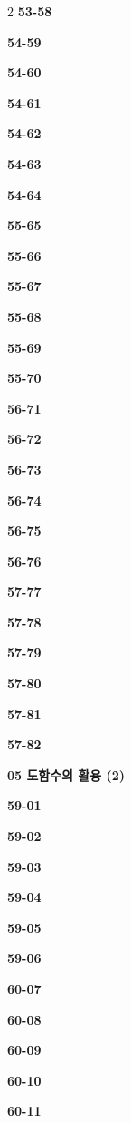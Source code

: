 \documentclass[10pt,a4paper]{article}
\begin{document}
\begin{multicols}{2}
\noindent\textbf{53-58}\ \par
\noindent\textbf{54-59}\ \par
\noindent\textbf{54-60}\ \par
\noindent\textbf{54-61}\ \par
\noindent\textbf{54-62}\ \par
\noindent\textbf{54-63}\ \par
\noindent\textbf{54-64}\ \par
\noindent\textbf{55-65}\ \par
\noindent\textbf{55-66}\ \par
\noindent\textbf{55-67}\ \par
\noindent\textbf{55-68}\ \par
\noindent\textbf{55-69}\ \par
\noindent\textbf{55-70}\ \par
\noindent\textbf{56-71}\ \par
\noindent\textbf{56-72}\ \par
\noindent\textbf{56-73}\ \par
\noindent\textbf{56-74}\ \par
\noindent\textbf{56-75}\ \par
\noindent\textbf{56-76}\ \par
\noindent\textbf{57-77}\ \par
\noindent\textbf{57-78}\ \par
\noindent\textbf{57-79}\ \par
\noindent\textbf{57-80}\ \par
\noindent\textbf{57-81}\ \par
\noindent\textbf{57-82}\ \par
\noindent\textbf{05 도함수의 활용 (2)}\par\smallskip
\noindent\textbf{59-01}\ \par
\noindent\textbf{59-02}\ \par
\noindent\textbf{59-03}\ \par
\noindent\textbf{59-04}\ \par
\noindent\textbf{59-05}\ \par
\noindent\textbf{59-06}\ \par
\noindent\textbf{60-07}\ \par
\noindent\textbf{60-08}\ \par
\noindent\textbf{60-09}\ \par
\noindent\textbf{60-10}\ \par
\noindent\textbf{60-11}\ \par

\end{multicols}
\end{document}
